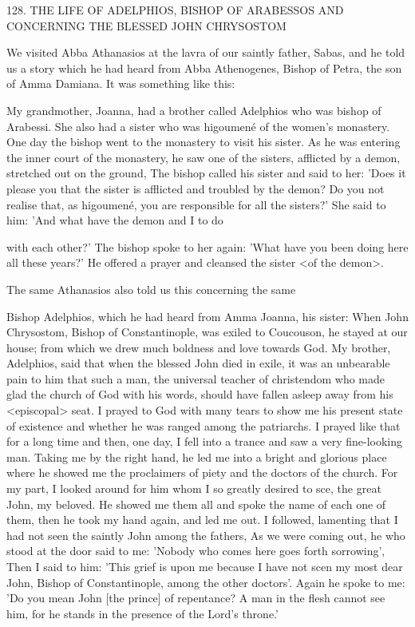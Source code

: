 128.
THE LIFE OF ADELPHIOS,
BISHOP OF ARABESSOS
AND CONCERNING THE BLESSED
JOHN CHRYSOSTOM

We visited Abba Athanasios at the lavra of our saintly father,
Sabas, and he told us a story which he had heard from Abba
Athenogenes, Bishop of Petra, the son of Amma Damiana.
It was
something like this:

My grandmother, Joanna, had a brother called Adelphios who was
bishop of Arabessi.
She also had a sister who was higoumené of the
women's monastery.
One day the bishop went to the monastery to
visit his sister.
As he was entering the inner court of the monastery,
he saw one of the sisters, afflicted by a demon, stretched out on the
ground, The bishop called his sister and said to her: 'Does it please
you that the sister is afflicted and troubled by the demon? Do you
not realise that, as higoumené, you are responsible for all the
sisters?' She said to him: 'And what have the demon and I to do

with each other?' The bishop spoke to her again: 'What have you
been doing here all these years?' He offered a prayer and cleansed
the sister <of the demon>.

The same Athanasios also told us this concerning the same

Bishop Adelphios, which he had heard from Amma Joanna, his
sister:
When John Chrysostom, Bishop of Constantinople, was exiled to
Coucouson, he stayed at our house; from which we drew much
boldness and love towards God.
My brother, Adelphios, said that
when the blessed John died in exile, it was an unbearable pain to
him that such a man, the universal teacher of christendom who
made glad the church of God with his words, should have fallen
asleep away from his <episcopal> seat.
I prayed to God with many
tears to show me his present state of existence and whether he was
ranged among the patriarchs.
I prayed like that for a long time and
then, one day, I fell into a trance and saw a very fine-looking man.
Taking me by the right hand, he led me into a bright and glorious
place where he showed me the proclaimers of piety and the doctors
of the church.
For my part, I looked around for him whom I so
greatly desired to sce, the great John, my beloved.
He showed me
them all and spoke the name of each one of them, then he took my
hand again, and led me out.
I followed, lamenting that I had not
seen the saintly John among the fathers, As we were coming out, he
who stood at the door said to me: 'Nobody who comes here goes
forth sorrowing', Then I said to him: 'This grief is upon me because
I have not scen my most dear John, Bishop of Constantinople,
among the other doctors'.
Again he spoke to me: 'Do you mean
John [the prince] of repentance? A man in the flesh cannot see him,
for he stands in the presence of the Lord's throne.'

